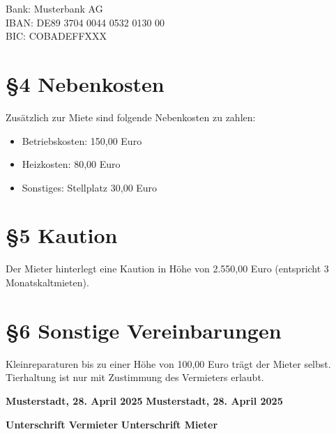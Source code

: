 \documentclass[12pt,a4paper]{article}
\begin{document}
\vspace{0.3cm}
Bank: Musterbank AG\\
IBAN: DE89 3704 0044 0532 0130 00\\
BIC: COBADEFFXXX

\vspace{0.5cm}

\section*{§4 Nebenkosten}
Zusätzlich zur Miete sind folgende Nebenkosten zu zahlen:

\begin{itemize}
    \item Betriebskosten: 150,00 Euro
    \item Heizkosten: 80,00 Euro
    \item Sonstiges: Stellplatz 30,00 Euro
\end{itemize}

\vspace{0.5cm}

\section*{§5 Kaution}
Der Mieter hinterlegt eine Kaution in Höhe von 2.550,00 Euro (entspricht 3 Monatskaltmieten).

\vspace{0.5cm}

\section*{§6 Sonstige Vereinbarungen}
Kleinreparaturen bis zu einer Höhe von 100,00 Euro trägt der Mieter selbst.\\
Tierhaltung ist nur mit Zustimmung des Vermieters erlaubt.

\vspace{2cm}

\textbf{Musterstadt, 28. April 2025} \hfill \textbf{Musterstadt, 28. April 2025}

\vspace{1cm}

\textbf{Unterschrift Vermieter} \hfill \textbf{Unterschrift Mieter}
\end{document}
